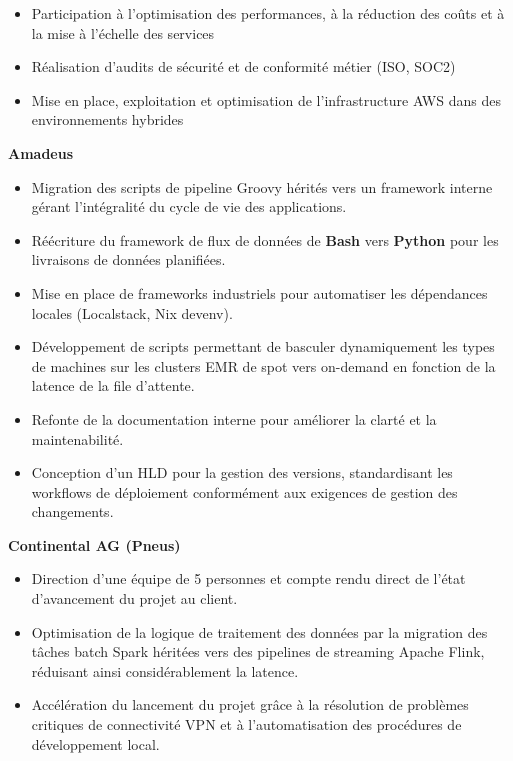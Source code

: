 
\small
\begin{itemize}[label=\tiny$\bullet$, leftmargin=1em]
	\item Participation à l'optimisation des performances, à la réduction des coûts et à la mise à l'échelle des services
	\item Réalisation d'audits de sécurité et de conformité métier (ISO, SOC2)
	\item Mise en place, exploitation et optimisation de l'infrastructure AWS dans des environnements hybrides
\end{itemize}


\small

\noindent \textbf{Amadeus}

\begin{itemize}[label=\tiny$\bullet$, leftmargin=1em]
	\item Migration des scripts de pipeline Groovy hérités vers un framework interne gérant l'intégralité du cycle de vie des applications.
	\item Réécriture du framework de flux de données de \textbf{Bash} vers \textbf{Python} pour les livraisons de données planifiées.
	\item Mise en place de frameworks industriels pour automatiser les dépendances locales (Localstack, Nix devenv).
	\item Développement de scripts permettant de basculer dynamiquement les types de machines sur les clusters EMR de spot vers on-demand en fonction de la latence de la file d'attente.
	\item Refonte de la documentation interne pour améliorer la clarté et la maintenabilité.
	\item Conception d'un HLD pour la gestion des versions, standardisant les workflows de déploiement conformément aux exigences de gestion des changements.
\end{itemize}

\vspace{3.0ex}
 {}
\small

\noindent \textbf{Continental AG (Pneus)}
\begin{itemize}[label=\tiny$\bullet$, leftmargin=1em, nosep]
	\item Direction d'une équipe de 5 personnes et compte rendu direct de l'état d'avancement du projet au client.
	\item Optimisation de la logique de traitement des données par la migration des tâches batch Spark héritées vers des pipelines de streaming Apache Flink, réduisant ainsi considérablement la latence.
	\item Accélération du lancement du projet grâce à la résolution de problèmes critiques de connectivité VPN et à l'automatisation des procédures de développement local.
\end{itemize}

